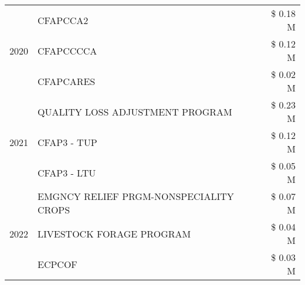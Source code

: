 \begin{tabular}{llr}
\cline{1-3}
\multirow[t]{3}{*}{2020} & CFAPCCA2 & \$ 0.18 M \\
 & CFAPCCCCA & \$ 0.12 M \\
 & CFAPCARES & \$ 0.02 M \\
\cline{1-3}
\multirow[t]{3}{*}{2021} & QUALITY LOSS ADJUSTMENT PROGRAM & \$ 0.23 M \\
 & CFAP3 - TUP & \$ 0.12 M \\
 & CFAP3 - LTU & \$ 0.05 M \\
\cline{1-3}
\multirow[t]{3}{*}{2022} & EMGNCY RELIEF PRGM-NONSPECIALITY CROPS & \$ 0.07 M \\
 & LIVESTOCK FORAGE PROGRAM & \$ 0.04 M \\
 & ECPCOF & \$ 0.03 M \\
\cline{1-3}
\bottomrule
\end{tabular}
